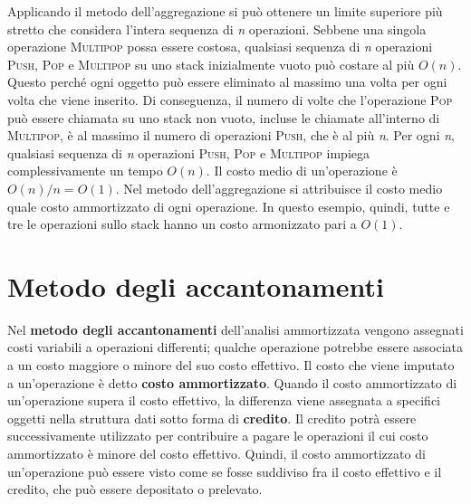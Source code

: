 \documentclass[10pt, a4paper]{report}
\begin{document}
Applicando il metodo dell'aggregazione si può ottenere un limite superiore più stretto che considera l'intera sequenza di \textit{n} operazioni. Sebbene una singola operazione \textsc{Multipop} possa essere costosa, qualsiasi sequenza di \textit{n} operazioni \textsc{Push}, \textsc{Pop} e \textsc{Multipop} su uno stack inizialmente vuoto può costare al più $O(n)$. Questo perché ogni oggetto può essere eliminato al massimo una volta  per ogni volta che viene inserito. Di conseguenza, il numero di volte che l'operazione \textsc{Pop} può essere chiamata su uno stack non vuoto, incluse le chiamate all'interno di \textsc{Multipop}, è al massimo il numero di operazioni \textsc{Push}, che è al più \textit{n}. Per ogni \textit{n}, qualsiasi sequenza di \textit{n} operazioni \textsc{Push}, \textsc{Pop} e \textsc{Multipop} impiega complessivamente un tempo $O(n)$. Il costo medio di un'operazione è $O(n)/n = O(1)$. Nel metodo dell'aggregazione si attribuisce il costo medio quale costo ammortizzato di ogni operazione. In questo esempio, quindi, tutte e tre le operazioni sullo stack hanno un costo armonizzato pari a $O(1)$.
\section{Metodo degli accantonamenti}
Nel \textbf{metodo degli accantonamenti} dell'analisi ammortizzata vengono assegnati costi variabili a operazioni differenti; qualche operazione potrebbe essere associata a un costo maggiore o minore del suo costo effettivo. Il costo che viene imputato a un'operazione è detto \textbf{costo ammortizzato}. Quando il costo ammortizzato di un'operazione supera il costo effettivo, la differenza viene assegnata a specifici oggetti nella struttura dati sotto forma di \textbf{credito}. Il credito potrà essere successivamente utilizzato  per contribuire a pagare le operazioni il cui costo ammortizzato è minore del costo effettivo. Quindi, il costo ammortizzato di un'operazione può essere visto come se fosse suddiviso fra il costo effettivo  e il credito, che può essere depositato o prelevato.
\end{document}

